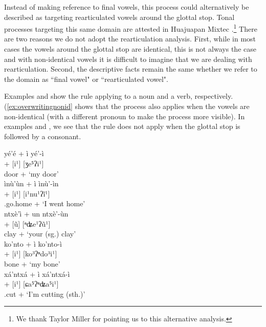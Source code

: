 \documentclass[output=paper]{langscibook}
\begin{document}
Instead of making reference to final vowels, this process could alternatively be described as targeting rearticulated vowels around the glottal stop. Tonal processes targeting this same domain are attested in Huajuapan Mixtec \citep{pike1967huajuapan}.\footnote{We thank Taylor Miller for pointing us to this alternative analysis.}
There are two reasons we do not adopt the rearticulation analysis. First, while in most cases the vowels around the glottal stop are identical, this is not always the case and with non-identical vowels it is difficult to imagine that we are dealing with rearticulation. 
Second, the descriptive facts remain the same whether we refer to the domain as ``final vowel" or ``rearticulated vowel".

Examples  and  show the rule applying to a noun and a verb, respectively. (\ref{ex:overwritingnonid} shows that the process also applies when the vowels are non-identical (with a different pronoun to make the process more visible).
In examples  and , we see that the rule does not apply when the glottal stop is followed by a consonant.

\ea \label{ex:overwriting}
 \ea \label{ex:overwritingnoun}
    \glll yé'é  + ì \MVRightarrow{} yé'-ì \\
        [ʒe⁵ʔe⁵] + [i¹] \MVRightarrow{} [ʒe⁵ʔi¹] \\
      door  + \Fsg{}  \MVRightarrow{} {`my door'} \\
 \ex \label{ex:overwritingverb}
    \glll ìnù'ùn  + ì \MVRightarrow{} ìnù'-ìn  \\
            [i¹nu¹ʔũ¹] + [i¹] \MVRightarrow{} [i¹nu¹ʔĩ¹] \\
     \Cmpl.go.home + \Fsg{} \MVRightarrow{} {`I went home'}  \\
 \ex \label{ex:overwritingnonid}
    \glll ntxè'ì + un \MVRightarrow{} ntxè'-ùn  \\
    [ⁿʥe¹ʔi¹] + [ũ] \MVRightarrow{} [ⁿʥe¹ʔũ¹] \\
    clay  + \Ssg{} \MVRightarrow{} {`your (sg.) clay'}  \\
\ex \label{ex:notoverwritingnoun}
    \glll ko'nto + ì \MVRightarrow{} ko'nto-ì \\
    [ko³ʔⁿdo³] + [i¹] \MVRightarrow{} [ko³ʔⁿdo³i¹] \\
    bone + \Fsg{} \MVRightarrow{} {`my bone'}  \\
 \ex \label{ex:notoverwritingverb}
    \glll xá'ntxá + ì \MVRightarrow{} xá'ntxá-ì \\
    [ɕa⁵ʔⁿʥa⁵] + [i¹] \MVRightarrow{} [ɕa⁵ʔⁿʥa⁵i¹] \\
     \Incmpl.cut  + \Fsg{} \MVRightarrow{} {`I'm cutting (sth.)'} \\
 \z
\z
\end{document}
